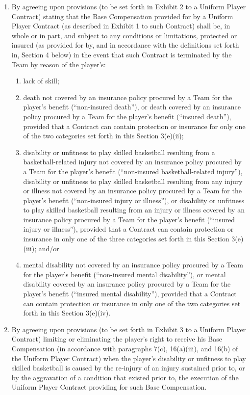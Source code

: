 \documentclass[
]{book}
\providecommand{\tightlist}{%
  \setlength{\itemsep}{0pt}\setlength{\parskip}{0pt}}
\begin{document}
\begin{enumerate}
\item
  By agreeing upon provisions (to be set forth in Exhibit 2 to a Uniform Player Contract) stating that the Base Compensation provided for by a Uniform Player Contract (as described in Exhibit 1 to such Contract) shall be, in whole or in part, and subject to any conditions or limitations, protected or insured (as provided for by, and in accordance with the definitions set forth in, Section 4 below) in the event that such Contract is terminated by the Team by reason of the player's:

  \begin{enumerate}
  \def\labelenumii{(\roman{enumii})}
  \tightlist
  \item
    lack of skill;
  \item
    death not covered by an insurance policy procured by a Team for the player's benefit (``non-insured death''), or death covered by an insurance policy procured by a Team for the player's benefit (``insured death''), provided that a Contract can contain protection or insurance for only one of the two categories set forth in this Section 3(e)(ii);
  \item
    disability or unfitness to play skilled basketball resulting from a basketball-related injury not covered by an insurance policy procured by a Team for the player's benefit (``non-insured basketball-related injury''), disability or unfitness to play skilled basketball resulting from any injury or illness not covered by an insurance policy procured by a Team for the player's benefit (``non-insured injury or illness''), or disability or unfitness to play skilled basketball resulting from an injury or illness covered by an insurance policy procured by a Team for the player's benefit (``insured injury or illness''), provided that a Contract can contain protection or insurance in only one of the three categories set forth in this Section 3(e)(iii); and/or
  \item
    mental disability not covered by an insurance policy procured by a Team for the player's benefit (``non-insured mental disability''), or mental disability covered by an insurance policy procured by a Team for the player's benefit (``insured mental disability''), provided that a Contract can contain protection or insurance in only one of the two categories set forth in this Section 3(e)(iv).
  \end{enumerate}
\item
  By agreeing upon provisions (to be set forth in Exhibit 3 to a Uniform Player Contract) limiting or eliminating the player's right to receive his Base Compensation (in accordance with paragraphs 7(c), 16(a)(iii), and 16(b) of the Uniform Player Contract) when the player's disability or unfitness to play skilled basketball is caused by the re-injury of an injury sustained prior to, or by the aggravation of a condition that existed prior to, the execution of the Uniform Player Contract providing for such Base Compensation.

\end{enumerate}
\end{document}
